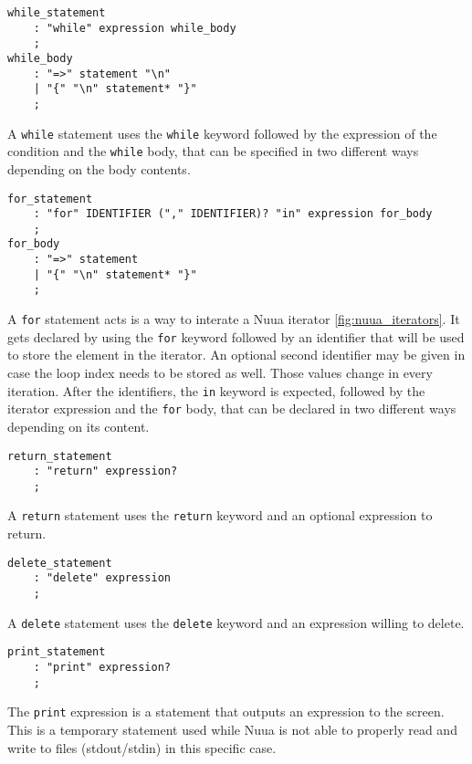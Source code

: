 \begin{lstlisting}
while_statement
    : "while" expression while_body
    ;
while_body
    : "=>" statement "\n"
    | "{" "\n" statement* "}"
    ;
\end{lstlisting}

A \texttt{while} statement uses the \texttt{while} keyword followed by the expression of the condition and the \texttt{while} body, that can be specified
in two different ways depending on the body contents.

\begin{lstlisting}
for_statement
    : "for" IDENTIFIER ("," IDENTIFIER)? "in" expression for_body
    ;
for_body
    : "=>" statement
    | "{" "\n" statement* "}"
    ;
\end{lstlisting}

A \texttt{for} statement acts is a way to interate a Nuua iterator \autoref{fig:nuua_iterators}.
It gets declared by using the \texttt{for} keyword followed by an identifier that will be used to store the element
in the iterator. An optional second identifier may be given in case the loop index needs to be stored as well.
Those values change in every iteration. After the identifiers, the \texttt{in} keyword is expected, followed by the iterator expression and the
\texttt{for} body, that can be declared in two different ways depending on its content.

\begin{lstlisting}
return_statement
    : "return" expression?
    ;
\end{lstlisting}

A \texttt{return} statement uses the \texttt{return} keyword and an optional expression to return.

\begin{lstlisting}
delete_statement
    : "delete" expression
    ;
\end{lstlisting}

A \texttt{delete} statement uses the \texttt{delete} keyword and an expression willing to delete.

\begin{lstlisting}
print_statement
    : "print" expression?
    ;
\end{lstlisting}

The \texttt{print} expression is a statement that outputs an expression to the screen. This is a temporary statement used while
Nuua is not able to properly read and write to files (stdout/stdin) in this specific case.

